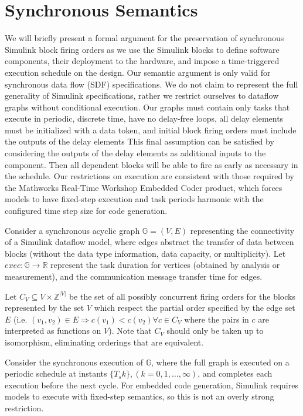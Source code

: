 \section{Synchronous Semantics}

We will briefly present a formal argument for the preservation of synchronous
Simulink block firing orders as we use the Simulink blocks to define software
components, their deployment to the hardware, and impose a time-triggered 
execution schedule on the design.  Our semantic argument is only valid for
synchronous data flow (SDF) specifications.  We do not claim to represent the
full generality of Simulink specifications, rather we restrict ourselves to
dataflow graphs without conditional execution.  Our graphs must contain only
tasks that execute in periodic, discrete time,  have no
delay-free loops, all delay elements must be initialized with a data token,
and initial block firing orders must include the outputs of the delay elements 
This final assumption can be satisfied by considering the outputs of the delay elements as additional inputs to the component.  Then all dependent blocks will be able to fire as early as necessary in the schedule.  Our restrictions on 
execution are consistent with those 
required by the Mathworks Real-Time Workshop Embedded Coder product, 
which forces models to have fixed-step execution and task periods 
harmonic with the configured time step size for code generation.

Consider a synchronous acyclic graph $\mathbb{G}=(V,E)$ representing the 
connectivity of a Simulink dataflow model, where edges abstract the transfer 
of data between blocks (without the data type information, data capacity, or 
multiplicity). Let $exec: \mathbb{G} \rightarrow \mathbb{R}$ represent the
task duration for vertices (obtained by analysis or measurement), and the
communication message transfer time for edges.

Let $C_V \subseteq V \times \mathbb{Z}^{|V|}$ be the set of all possibly 
concurrent firing orders for the blocks represented by the set $V$ which 
respect the partial order specified by the edge set $E$ (i.e. $(v_1, v_2) \in E \Rightarrow c(v_1) < c(v_2) \forall c \in C_V$ where the 
pairs in $c$ are interpreted as functions on $V$).  Note that $C_V$ 
should only be taken up to isomorphism, eliminating orderings that are 
equivalent.

Consider the synchronous execution of $\mathbb{G}$, where the full graph is 
executed on a periodic schedule at instants 
$\{T_s k\}, (k = 0,1,\ldots,\infty)$, and completes each execution before the 
next cycle.  For embedded code generation, Simulink requires models to 
execute with fixed-step semantics, so
this is not an overly strong restriction.

